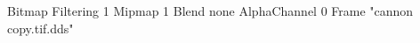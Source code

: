 {Bitmap
	{Filtering 1}
	{Mipmap 1}
	{Blend none}
	{AlphaChannel 0}
	{Frame "cannon copy.tif.dds"}
}
